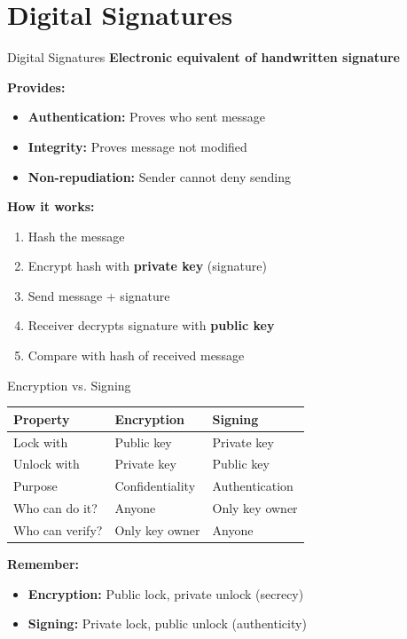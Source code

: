 \documentclass{beamer}
\begin{document}
\section{Digital Signatures}

\begin{frame}{Digital Signatures}
\textbf{Electronic equivalent of handwritten signature}

\vspace{0.3cm}
\textbf{Provides:}
\begin{itemize}
    \item \textbf{Authentication:} Proves who sent message
    \item \textbf{Integrity:} Proves message not modified
    \item \textbf{Non-repudiation:} Sender cannot deny sending
\end{itemize}

\vspace{0.3cm}
\textbf{How it works:}
\begin{enumerate}
    \item Hash the message
    \item Encrypt hash with \textbf{private key} (signature)
    \item Send message + signature
    \item Receiver decrypts signature with \textbf{public key}
    \item Compare with hash of received message
\end{enumerate}

\end{frame}

\begin{frame}{Encryption vs. Signing}
\begin{center}
\begin{tabular}{|l|l|l|}
\hline
\textbf{Property} & \textbf{Encryption} & \textbf{Signing} \\
\hline
Lock with & Public key & Private key \\
Unlock with & Private key & Public key \\
Purpose & Confidentiality & Authentication \\
Who can do it? & Anyone & Only key owner \\
Who can verify? & Only key owner & Anyone \\
\hline
\end{tabular}
\end{center}

\vspace{0.5cm}
\textbf{Remember:}
\begin{itemize}
    \item \textbf{Encryption:} Public lock, private unlock (secrecy)
    \item \textbf{Signing:} Private lock, public unlock (authenticity)
\end{itemize}
\end{frame}
\end{document}
